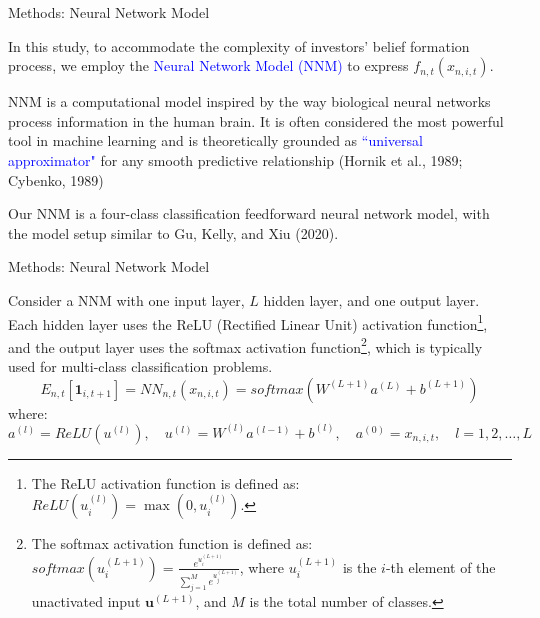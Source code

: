 \documentclass[11pt, aspectratio=169]{beamer}
\newenvironment{wideitemize}{\itemize\addtolength{\itemsep}{10pt}}{\enditemize}
\begin{document}
\begin{frame}{Methods: Neural Network Model}
\bigskip
\begin{wideitemize}
\item In this study, to accommodate the complexity of investors' belief formation process, we employ the \textcolor{blue}{Neural Network Model (NNM)} to express $f_{n,t}(x_{n,i,t})$.
\item NNM is a computational model inspired by the way \alert{biological neural networks} process information in the human brain. It is often considered the most powerful tool in machine learning and is theoretically grounded as \textcolor{blue}{``universal approximator"} for any smooth predictive relationship (Hornik et al., 1989; Cybenko, 1989)
\item Our NNM is a \alert{four-class classification feedforward neural network model}, with the model setup similar to Gu, Kelly, and Xiu (2020).
\end{wideitemize}
\end{frame}

\begin{frame}{Methods: Neural Network Model}
\bigskip
\begin{wideitemize}
\item Consider a NNM with one input layer, $L$ hidden layer, and one output layer. Each hidden layer uses the \alert{ReLU} (Rectified Linear Unit) activation function\footnote{The ReLU activation function is defined as: $ReLU(u^{(l)}_i)=\max(0,u^{(l)}_i)$.}, and the output layer uses the \alert{softmax} activation function\footnote{The softmax activation function is defined as: $softmax(u^{(L+1)}_i)=\frac{e^{u^{(L+1)}_i}}{\sum_{j=1}^Me^{u^{(L+1)}_j}}$, where $u^{(L+1)}_i$ is the $i$-th element of the unactivated input $\mathbf{u}^{(L+1)}$, and $M$ is the total number of classes.}, which is typically used for multi-class classification problems.
\begin{equation*}
  E_{n,t}[\mathbf{1}_{i,t+1}]=NN_{n,t}\left(x_{n,i,t}\right)=softmax\left(W^{(L+1)}a^{(L)}+b^{(L+1)}\right) \label{nn}
\end{equation*}
where:$$a^{(l)}=ReLU(u^{(l)}),\quad u^{(l)}=W^{(l)}a^{(l-1)}+b^{(l)},\quad a^{(0)}={x_{n,i,t}},\quad l=1,2,\ldots,L$$
\end{wideitemize}
\end{frame}
\end{document}
